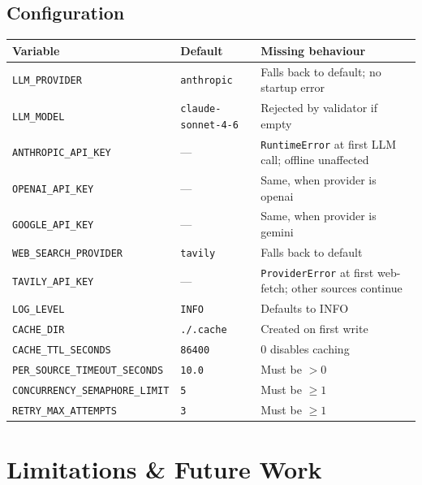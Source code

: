 \documentclass[11pt,a4paper]{article}
\begin{document}
\subsection{Configuration}

\begin{center}\small
\begin{tabular}{p{4.2cm}p{2.5cm}p{6.5cm}}
\toprule
\textbf{Variable} & \textbf{Default} & \textbf{Missing behaviour} \\
\midrule
\texttt{LLM\_PROVIDER} & \texttt{anthropic} & Falls back to default; no startup error \\
\texttt{LLM\_MODEL} & \texttt{claude-sonnet-4-6} & Rejected by validator if empty \\
\texttt{ANTHROPIC\_API\_KEY} & --- & \texttt{RuntimeError} at first LLM call; offline unaffected \\
\texttt{OPENAI\_API\_KEY} & --- & Same, when provider is openai \\
\texttt{GOOGLE\_API\_KEY} & --- & Same, when provider is gemini \\
\texttt{WEB\_SEARCH\_PROVIDER} & \texttt{tavily} & Falls back to default \\
\texttt{TAVILY\_API\_KEY} & --- & \texttt{ProviderError} at first web-fetch; other sources continue \\
\texttt{LOG\_LEVEL} & \texttt{INFO} & Defaults to INFO \\
\texttt{CACHE\_DIR} & \texttt{./.cache} & Created on first write \\
\texttt{CACHE\_TTL\_SECONDS} & \texttt{86400} & 0 disables caching \\
\texttt{PER\_SOURCE\_TIMEOUT\_SECONDS} & \texttt{10.0} & Must be $> 0$ \\
\texttt{CONCURRENCY\_SEMAPHORE\_LIMIT} & \texttt{5} & Must be $\geq 1$ \\
\texttt{RETRY\_MAX\_ATTEMPTS} & \texttt{3} & Must be $\geq 1$ \\
\bottomrule
\end{tabular}
\end{center}

\section{Limitations \& Future Work}\label{sec:limits}
\end{document}
